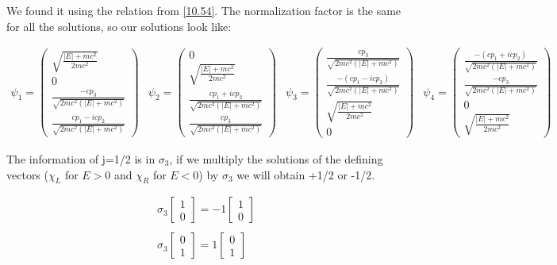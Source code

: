 We found it using the relation from \ref{10.54}. The normalization factor is the same for all the solutions, so our solutions look like:

\begin{equation}
  \begin{array}{cccc}
    \psi_1 = \begin{pmatrix}
      \sqrt{\frac{|E|+mc^2}{2mc^2}}\\
      0\\
      \frac{-cp_3}{\sqrt{2mc^2(|E|+mc^2)}}\\
      \frac{cp_1-icp_2}{\sqrt{2mc^2(|E|+mc^2)}}
    \end{pmatrix}&
    \psi_2 = \begin{pmatrix}
      0\\
      \sqrt{\frac{|E|+mc^2}{2mc^2}}\\
      \frac{cp_1+icp_2}{\sqrt{2mc^2(|E|+mc^2)}}\\
      \frac{cp_3}{\sqrt{2mc^2(|E|+mc^2)}}
    \end{pmatrix}&
    \psi_3 = \begin{pmatrix}
      \frac{cp_3}{\sqrt{2mc^2(|E|+mc^2)}}\\
      \frac{-(cp_1-icp_2)}{\sqrt{2mc^2(|E|+mc^2)}}\\
      \sqrt{\frac{|E|+mc^2}{2mc^2}}\\
      0
    \end{pmatrix}&
    \psi_4 = \begin{pmatrix}
      \frac{-(cp_1+icp_2)}{\sqrt{2mc^2(|E|+mc^2)}}\\
      \frac{-cp_3}{\sqrt{2mc^2(|E|+mc^2)}}\\
      0\\
      \sqrt{\frac{|E|+mc^2}{2mc^2}}
    \end{pmatrix}
  \end{array}
\end{equation}

The information of j=1/2 is in $\sigma_3$, if we multiply the solutions of the defining vectors ($\chi_L$ for $E>0$ and $\chi_R$ for $E<0$) by $\sigma_3$ we will obtain +1/2 or -1/2.

\begin{equation}
  \begin{array}{c}
  \sigma_3 \begin{bmatrix}
    1\\
    0
  \end{bmatrix} = -1 \begin{bmatrix}
    1\\
    0
  \end{bmatrix}
  \\

  \\
  \sigma_3 \begin{bmatrix}
    0\\
    1
  \end{bmatrix} = 1 \begin{bmatrix}
    0\\
    1
  \end{bmatrix}
  \end{array}
\end{equation}

